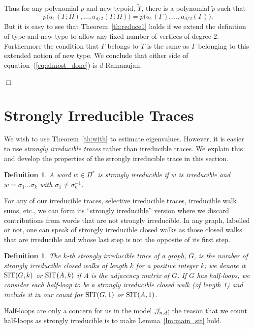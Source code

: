 \documentclass[12pt]{article}
\newtheorem{definition}[theorem]{Definition}
\newcommand{\dtreelike}{{$d$-Ramanujan}}
\newcommand{\cj}{{\cal J}}
\newcommand{\cjnd}{\cj_{n,d}}
\newcommand{\sit}{{\rm SIT}}
\newcommand{\proofbox}{\begin{flushright}$\Box$\end{flushright}}
\begin{document}
Thus for any polynomial $p$ and new
typoid, $\widetilde T$, there is a polynomial $\widetilde p$ such that
\begin{equation}\label{eq:almost_done}
p\bigl( a_1(\Gamma;\Omega),\ldots,a_{d/2}(\Gamma;\Omega) \bigr) =
\widetilde p\bigl( 
a_1(\Gamma),\ldots,a_{d/2}(\Gamma) \bigr).
\end{equation}
But it is easy to see that Theorem~\ref{th:reduce1} holds if we extend
the definition of type and new type to allow any fixed number of vertices
of degree $2$.  Furthermore
the condition that $\Gamma$ belongs to $\widetilde T$ is the same as 
$\Gamma$ belonging to this extended notion of new type.
We conclude that either side of equation~(\ref{eq:almost_done}) is
{\dtreelike}.
\proofbox








\section{Strongly Irreducible Traces}

We wish to use Theorem~\ref{th:with} to estimate eigenvalues.  However,
it is easier to use {\em strongly irreducible traces} rather than 
irreducible traces.  We explain this and develop the properties of
the strongly irreducible trace in this section.


\begin{definition} A word $w\in\Pi^*$ is {\em strongly irreducible} if
$w$ is irreducible and $w=\sigma_1\ldots\sigma_k$ with $\sigma_1\ne
\sigma_k^{-1}$.
\end{definition}
For any of our irreducible traces, selective irreducible traces,
irreducible walk sums, etc., we can form its ``strongly irreducible''
version where we discard contributions from words that are not
strongly irreducible.
In any graph, labelled or not, one can speak of strongly
irreducible closed walks as those closed walks that are irreducible and whose last
step is not the opposite of its first step.
\begin{definition} The {$k$-th strongly irreducible trace} of a graph,
$G$, is the number of strongly irreducible closed walks of length $k$ for a
positive integer $k$; we
denote it $\sit(G,k)$ or $\sit(A,k)$ if $A$ is the adjacency matrix of $G$.
If $G$ has half-loops, we consider each half-loop to be a strongly
irreducible closed walk (of length 1) and include it in our count for
$\sit(G,1)$ or $\sit(A,1)$.
\end{definition}
Half-loops are only a concern for us in the model $\cjnd$; the reason
that we count half-loops as strongly irreducible is to make
Lemma~\ref{lm:main_sit} hold.
\end{document}
